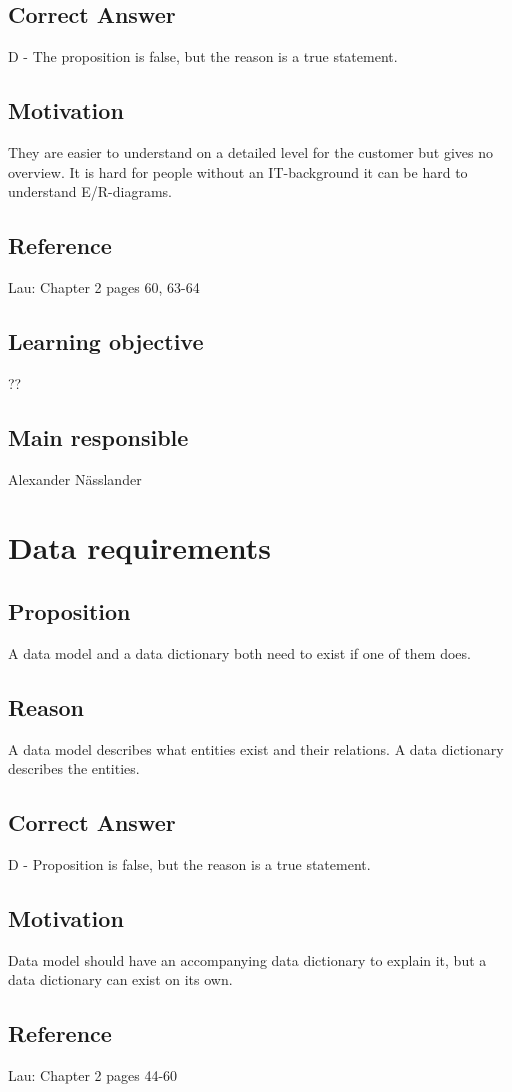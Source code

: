 \documentclass[a4paper]{article}
\begin{document}
\subsection*{Correct Answer}
D - The proposition is false, but the reason is a true statement.
\subsection*{Motivation}
They are easier to understand on a detailed level for the customer but gives no overview. It is hard for people without an IT-background it can be hard to understand E/R-diagrams.
\subsection*{Reference}
Lau: Chapter 2 pages 60, 63-64
\subsection*{Learning objective}
??
\subsection*{Main responsible}
Alexander Nässlander


\section{Data requirements}
\subsection*{Proposition}
A data model and a data dictionary both need to exist if one of them does.
\subsection*{Reason}
A data model describes what entities exist and their relations. A data dictionary describes the entities.
\subsection*{Correct Answer}
D - Proposition is false, but the reason is a true statement.
\subsection*{Motivation}
Data model should have an accompanying data dictionary to explain it, but a data dictionary can exist on its own.
\subsection*{Reference}
Lau: Chapter 2 pages 44-60
\end{document}
